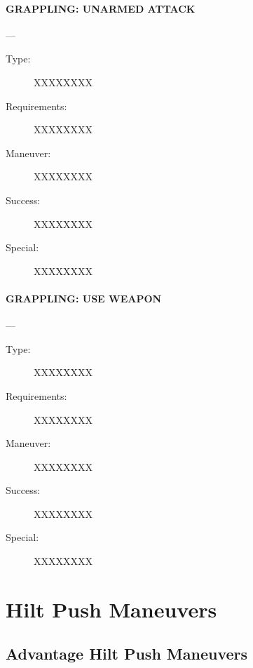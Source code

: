 \documentclass[oneside,11pt,english]{book}
\begin{document}
\paragraph{\large\label{man:GRAPPLING: UNARMED ATTACK} GRAPPLING: UNARMED ATTACK}---\quad{\large[??????]}
\vspace{-10pt}\begin{description} 
\item [Type:] XXXXXXXX 
\item [Requirements:] XXXXXXXX 
\item [Maneuver:] XXXXXXXX 
\item [Success:] XXXXXXXX 
\item [Special:] XXXXXXXX 
\end{description}
\paragraph{\large\label{man:GRAPPLING: USE WEAPON} GRAPPLING: USE WEAPON}---\quad{\large[??????]}
\vspace{-10pt}\begin{description} 
\item [Type:] XXXXXXXX 
\item [Requirements:] XXXXXXXX 
\item [Maneuver:] XXXXXXXX 
\item [Success:] XXXXXXXX 
\item [Special:] XXXXXXXX 
\end{description}
\section{Hilt Push Maneuvers}
\subsection{Advantage Hilt Push Maneuvers}
\end{document}
